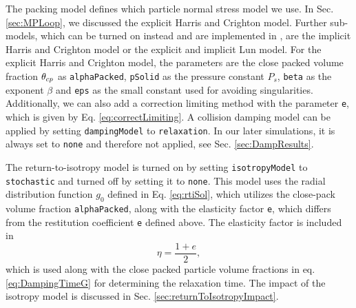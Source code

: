 The packing model defines which particle normal stress model we use. In Sec. \ref{sec:MPLoop}, we discussed the explicit Harris and Crighton model.
Further sub-models, which can be turned on instead and are implemented in \OFns, are the implicit Harris and Crighton model or the explicit and implicit Lun model.
For the explicit Harris and Crighton model, the parameters are the close packed volume fraction $\theta_{cp}$ as \lstinline|alphaPacked|, \lstinline|pSolid| as the pressure constant $P_s$, \lstinline|beta| as the exponent $\beta$ and \lstinline|eps| as the small constant used for avoiding singularities.
Additionally, we can also add a correction limiting method with the parameter \lstinline|e|, which is given by Eq. \eqref{eq:correctLimiting}.
A collision damping model can be applied by setting \lstinline|dampingModel| to \lstinline|relaxation|. 
In our later simulations, it is always set to \lstinline|none| and therefore not applied, see Sec. \ref{sec:DampResults}.

The return-to-isotropy model is turned on by setting \lstinline|isotropyModel| to \lstinline|stochastic| and turned off by setting it to \lstinline|none|.
This model uses the radial distribution function $g_0$ defined in Eq. \eqref{eq:rtiSol}, which utilizes the close-pack volume fraction \lstinline|alphaPacked|, along with the elasticity factor \lstinline|e|, which differs from the restitution coefficient \lstinline|e| defined above.
The elasticity factor is included in
\begin{equation}
    \eta = \dfrac{1+e}{2},
\end{equation}
which is used along with the close packed particle volume fractions in eq. \eqref{eq:DampingTimeG} for determining the relaxation time.
The impact of the isotropy model is discussed in Sec. \ref{sec:returnToIsotropyImpact}.





